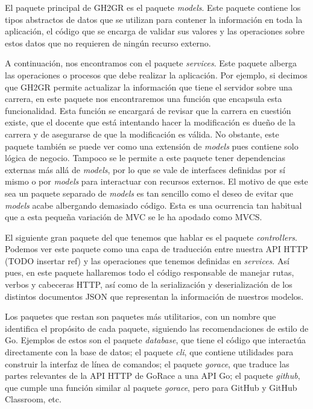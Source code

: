 El paquete principal de GH2GR es el paquete \textit{models}. Este paquete contiene los tipos abstractos de datos que se utilizan para contener la información en toda la aplicación, el código que se encarga de validar sus valores y las operaciones sobre estos datos que no requieren de ningún recurso externo.

A continuación, nos encontramos con el paquete \textit{services}. Este paquete alberga las operaciones o procesos que debe realizar la aplicación. Por ejemplo, si decimos que GH2GR permite actualizar la información que tiene el servidor sobre una carrera, en este paquete nos encontraremos una función que encapsula esta funcionalidad. Esta función se encargará de revisar que la carrera en cuestión existe, que el docente que está intentando hacer la modificación es dueño de la carrera y de asegurarse de que la modificación es válida. No obstante, este paquete también se puede ver como una extensión de \textit{models} pues contiene solo lógica de negocio. Tampoco se le permite a este paquete tener dependencias externas más allá de \textit{models}, por lo que se vale de interfaces definidas por sí mismo o por \textit{models} para interactuar con recursos externos. El motivo de que este sea un paquete separado de \textit{models} es tan sencillo como el deseo de evitar que \textit{models} acabe albergando demasiado código. Esta es una ocurrencia tan habitual que a esta pequeña variación de \acrshort{MVC} se le ha apodado como \acrshort{MVCS}\cite{mvcs}.

El siguiente gran paquete del que tenemos que hablar es el paquete \textit{controllers}. Podemos ver este paquete como una capa de traducción entre nuestra \acrshort{API} \acrshort{HTTP} (TODO insertar ref) y las operaciones que tenemos definidas en \textit{services}. Así pues, en este paquete hallaremos todo el código responsable de manejar rutas, verbos y cabeceras \acrshort{HTTP}, así como de la serialización y deserialización de los distintos documentos \acrshort{JSON} que representan la información de nuestros modelos.

Los paquetes que restan son paquetes más utilitarios, con un nombre que identifica el propósito de cada paquete, siguiendo las recomendaciones de estilo de Go\cite{goPackageNames}. Ejemplos de estos son el paquete \textit{database}, que tiene el código que interactúa directamente con la base de datos; el paquete \textit{cli}, que contiene utilidades para construir la interfaz de línea de comandos; el paquete \textit{gorace}, que traduce las partes relevantes de la \acrshort{API} \acrshort{HTTP} de GoRace a una \acrshort{API} Go; el paquete \textit{github}, que cumple una función similar al paquete \textit{gorace}, pero para GitHub y GitHub Classroom, etc.

